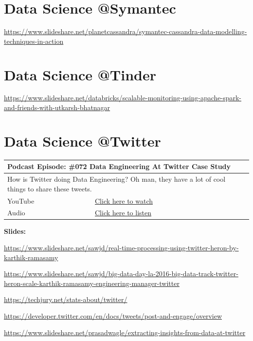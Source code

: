 \documentclass[12pt, numbers=noenddot]{scrreprt} %
\begin{document}
\section{Data Science @Symantec}
\url{https://www.slideshare.net/planetcassandra/symantec-cassandra-data-modelling-techniques-in-action}

\section{Data Science @Tinder}
\url{https://www.slideshare.net/databricks/scalable-monitoring-using-apache-spark-and-friends-with-utkarsh-bhatnagar}

\section{Data Science @Twitter}

\begin{table}[h]
\begin{tabular}{ll}
\hline
\multicolumn{2}{l}{\textbf{Podcast Episode:} \#072 Data Engineering At Twitter Case Study} \\ \hline
\multicolumn{2}{p{15cm}}{How is Twitter doing Data Engineering? Oh man, they have a lot of cool things to share these tweets. }         \\ \hline
\multicolumn{1}{l|}{YouTube}   & \href{https://youtu.be/UkqSR3IeLZ8}{Click here to watch}   \\ 
\multicolumn{1}{l|}{Audio}     & \href{https://anchor.fm/andreaskayy/episodes/072-Data-Engineering-At-Twitter-Case-Study-e45iqq}{Click here to listen}   \\ \hline
\end{tabular}
 \label{tbl:twittercasestudy}
\end{table}

\textbf{Slides:}

\url{https://www.slideshare.net/sawjd/real-time-processing-using-twitter-heron-by-karthik-ramasamy}

\url{https://www.slideshare.net/sawjd/big-data-day-la-2016-big-data-track-twitter-heron-scale-karthik-ramasamy-engineering-manager-twitter}

\url{https://techjury.net/stats-about/twitter/}

\url{https://developer.twitter.com/en/docs/tweets/post-and-engage/overview} 

\url{https://www.slideshare.net/prasadwagle/extracting-insights-from-data-at-twitter}
\end{document}
